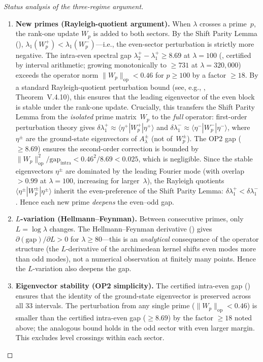 \documentclass[12pt,a4paper]{article}
\theoremstyle{definition}
\theoremstyle{remark}
\begin{document}
\begin{proof}[Status analysis of the three-regime argument]
\begin{enumerate}[label=(\roman*)]
  \item \textbf{New primes (Rayleigh-quotient argument).}
    When $\lambda$ crosses a prime~$p$, the rank-one update $W_p$ is added to both sectors.
    By the Shift Parity Lemma (), $\lambda_1(W_p^+) < \lambda_1(W_p^-)$---i.e., the even-sector perturbation is strictly more negative.
    The intra-even spectral gap $\lambda_2^+ - \lambda_1^+ \geq 8.69$ at $\lambda = 100$ (, certified by interval arithmetic; growing monotonically to $\geq 731$ at $\lambda = 320{,}000$) exceeds the operator norm $\|W_p\|_{\mathrm{op}} < 0.46$ for $p \geq 100$ by a factor $\geq 18$.
    By a standard Rayleigh-quotient perturbation bound (see, e.g., \cite{Kato1995}, Theorem~V.4.10), this ensures that the leading eigenvector of the even block is stable under the rank-one update.
    Crucially, this transfers the Shift Parity Lemma from the \emph{isolated} prime matrix~$W_p$ to the \emph{full} operator: first-order perturbation theory gives $\delta\lambda_1^+ \approx \langle \eta^+ | W_p^+ | \eta^+ \rangle$ and $\delta\lambda_1^- \approx \langle \eta^- | W_p^- | \eta^- \rangle$, where $\eta^\pm$ are the ground-state eigenvectors of $A_\lambda^\pm$ (not of~$W_p^\pm$).
    The OP2 gap ($\geq 8.69$) ensures the second-order correction is bounded by $\|W_p\|_{\mathrm{op}}^2 / \mathrm{gap}_{\mathrm{intra}} < 0.46^2/8.69 < 0.025$, which is negligible.
    Since the stable eigenvectors $\eta^\pm$ are dominated by the leading Fourier mode (with overlap $> 0.99$ at $\lambda = 100$, increasing for larger~$\lambda$), the Rayleigh quotients $\langle \eta^\pm | W_p^\pm | \eta^\pm \rangle$ inherit the even-preference of the Shift Parity Lemma: $\delta\lambda_1^+ < \delta\lambda_1^-$.
    Hence each new prime \emph{deepens} the even--odd gap.

  \item \textbf{$L$-variation (Hellmann--Feynman).}
    Between consecutive primes, only $L = \log\lambda$ changes.
    The Hellmann--Feynman derivative () gives $\partial(\mathrm{gap})/\partial L > 0$ for $\lambda \geq 80$---this is an \emph{analytical} consequence of the operator structure (the $L$-derivative of the archimedean kernel shifts even modes more than odd modes), not a numerical observation at finitely many points.
    Hence the $L$-variation also deepens the gap.

  \item \textbf{Eigenvector stability (OP2 simplicity).}
    The certified intra-even gap () ensures that the identity of the ground-state eigenvector is preserved across all $33$ intervals.
    The perturbation from any single prime ($\|W_p\|_{\mathrm{op}} < 0.46$) is smaller than the certified intra-even gap ($\geq 8.69$) by the factor $\geq 18$ noted above; the analogous bound holds in the odd sector with even larger margin.
    This excludes level crossings within each sector.
\end{enumerate}


\end{proof}
\end{document}
